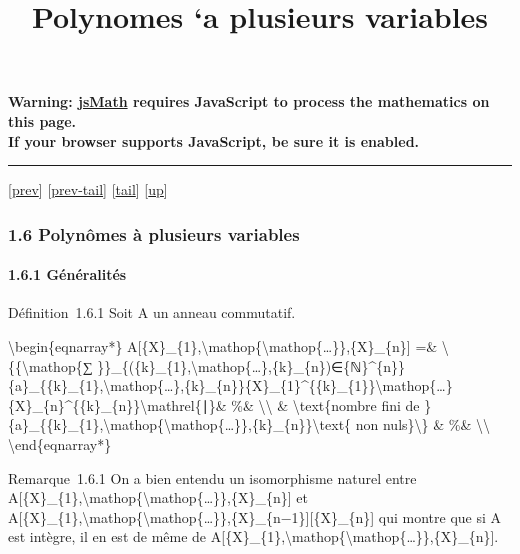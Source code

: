 \documentclass[]{article}
\title{Polynomes `a plusieurs variables}
\author{}
\date{}
\begin{document}
\maketitle

\textbf{Warning: \href{http://www.math.union.edu/locate/jsMath}{jsMath}
requires JavaScript to process the mathematics on this page.\\ If your
browser supports JavaScript, be sure it is enabled.}

\begin{center}\rule{3in}{0.4pt}\end{center}

{[}\href{coursse5.html}{prev}{]}
{[}\href{coursse5.html\#tailcoursse5.html}{prev-tail}{]}
{[}\hyperref[tailcoursse6.html]{tail}{]}
{[}\href{coursch2.html\#coursse6.html}{up}{]}

\subsubsection{1.6 Polynômes à plusieurs variables}

\paragraph{1.6.1 Généralités}

Définition~1.6.1 Soit A un anneau commutatif.

\textbackslash{}begin\{eqnarray*\}
A{[}\{X\}\_\{1\},\textbackslash{}mathop\{\textbackslash{}mathop\{\ldots{}\}\},\{X\}\_\{n\}{]}
=\& \textbackslash{}\{\{\textbackslash{}mathop\{∑
\}\}\_\{(\{k\}\_\{1\},\textbackslash{}mathop\{\ldots{}\},\{k\}\_\{n\})∈\{ℕ\}\^{}\{n\}\}\{a\}\_\{\{k\}\_\{1\},\textbackslash{}mathop\{\ldots{}\},\{k\}\_\{n\}\}\{X\}\_\{1\}\^{}\{\{k\}\_\{1\}\}\textbackslash{}mathop\{\ldots{}\}\{X\}\_\{n\}\^{}\{\{k\}\_\{n\}\}\textbackslash{}mathrel\{∣\}\&
\%\& \textbackslash{}\textbackslash{} \& \textbackslash{}text\{nombre
fini de
\}\{a\}\_\{\{k\}\_\{1\},\textbackslash{}mathop\{\textbackslash{}mathop\{\ldots{}\}\},\{k\}\_\{n\}\}\textbackslash{}text\{
non nuls\}\textbackslash{}\} \& \%\& \textbackslash{}\textbackslash{}
\textbackslash{}end\{eqnarray*\}

Remarque~1.6.1 On a bien entendu un isomorphisme naturel entre
A{[}\{X\}\_\{1\},\textbackslash{}mathop\{\textbackslash{}mathop\{\ldots{}\}\},\{X\}\_\{n\}{]}
et
A{[}\{X\}\_\{1\},\textbackslash{}mathop\{\textbackslash{}mathop\{\ldots{}\}\},\{X\}\_\{n−1\}{]}{[}\{X\}\_\{n\}{]}
qui montre que si A est intègre, il en est de même de
A{[}\{X\}\_\{1\},\textbackslash{}mathop\{\textbackslash{}mathop\{\ldots{}\}\},\{X\}\_\{n\}{]}.
\end{document}
